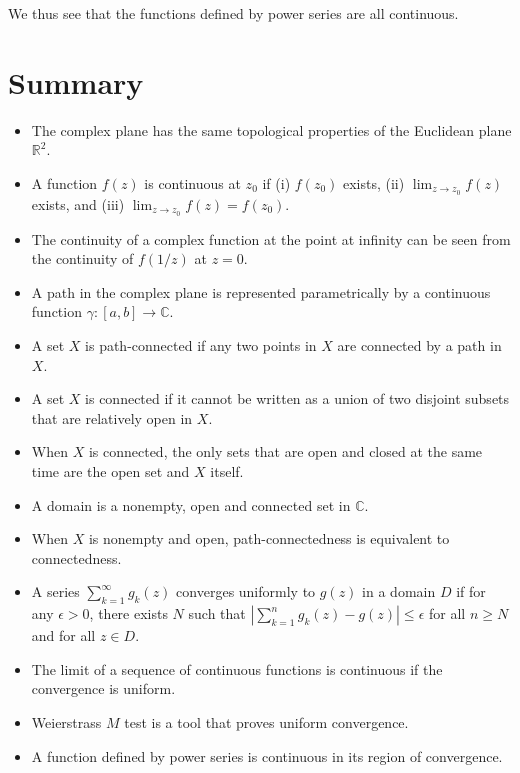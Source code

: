 We thus see that the functions defined by power series are all continuous.






\section*{Summary}

\begin{itemize}
\item The complex plane has the same topological properties of the Euclidean plane $\mathbb{R}^2$.

\item A function $f(z)$ is continuous at $z_0$ if  (i) $f(z_0)$ exists, (ii) $\lim_{z\rightarrow z_0} f(z)$ exists, and (iii) $\lim_{z\rightarrow z_0} f(z) = f(z_0)$.

\item The continuity of a complex function at the point at infinity can be seen from the continuity of $f(1/z)$ at $z=0$.

\item A path in the complex plane is represented parametrically by a continuous function $\gamma: [a,b] \rightarrow \mathbb{C}$.

\item A set $X$ is path-connected if any two points in $X$ are connected by a path in $X$.

\item A set $X$ is connected if it cannot be written as a union of two disjoint subsets that are relatively open in $X$.

\item When $X$ is connected, the only sets that are open and closed at the same time are the open set and $X$ itself. 

\item A domain is a nonempty, open and connected set in $\mathbb{C}$.

\item When $X$ is nonempty and open, path-connectedness is equivalent to connectedness.


\item A series $\sum_{k=1}^\infty g_k(z)$ converges  uniformly to $g(z)$ in a domain $D$ if for any $\epsilon >0$, there exists $N$ such that
$|\sum_{k=1}^n g_k(z) - g(z)| \leq \epsilon$ for all $n\geq N$ and for all $z\in D$.

\item The limit of a sequence of continuous functions is continuous if the convergence is uniform.


\item Weierstrass $M$ test is a tool that proves uniform convergence.

\item A function defined by power series is continuous in its region of convergence.

\end{itemize}


